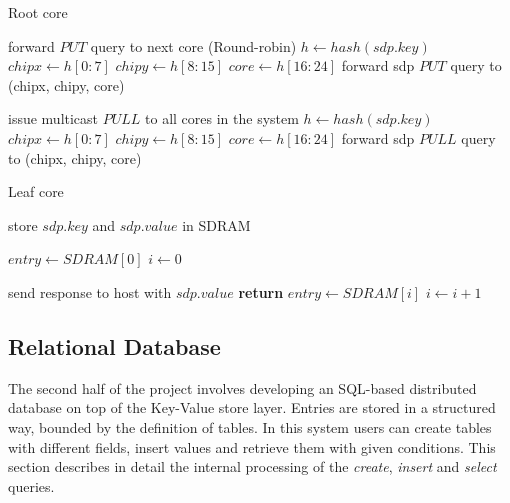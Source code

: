 \begin{algorithm}
\caption{Root core}
\label{alg:root}
\begin{algorithmic}[1]
			\State forward $PUT$ query to next core (Round-robin)
			\State $h \gets hash(sdp.key)$
			\State $chipx \gets h[0:7]$
			\State $chipy \gets h[8:15]$
			\State $core \gets h[16:24]$
			\State forward sdp $PUT$ query to (chipx, chipy, core)
		\EndIf
	\EndIf

			\State issue multicast $PULL$ to all cores in the system
			\State $h \gets hash(sdp.key)$
			\State $chipx \gets h[0:7]$
			\State $chipy \gets h[8:15]$
			\State $core \gets h[16:24]$
			\State forward sdp $PULL$ query to (chipx, chipy, core)
		\EndIf
	\EndIf
\EndProcedure
\end{algorithmic}
\end{algorithm}

\begin{algorithm}
\caption{Leaf core}
\label{alg:leaf}
\begin{algorithmic}[1]
		\State store $sdp.key$ and $sdp.value$ in SDRAM
	\EndIf

		\State $entry \gets SDRAM[0]$
		\State $i \gets 0$		
		
				\State send response to host with $sdp.value$
				\State \textbf{return}
			\EndIf
			\State $entry \gets SDRAM[i]$
			\State $i \gets i+1$
      	\EndWhile
	\EndIf
\EndProcedure
\end{algorithmic}
\end{algorithm}

\subsection{Relational Database}
The second half of the project involves developing an SQL-based distributed database on top of the Key-Value store layer. Entries are stored in a structured way, bounded by the definition of tables. In this system users can create tables with different fields, insert values and retrieve them with given conditions. This section describes in detail the internal processing of the \textit{create}, \textit{insert} and \textit{select} queries. 

